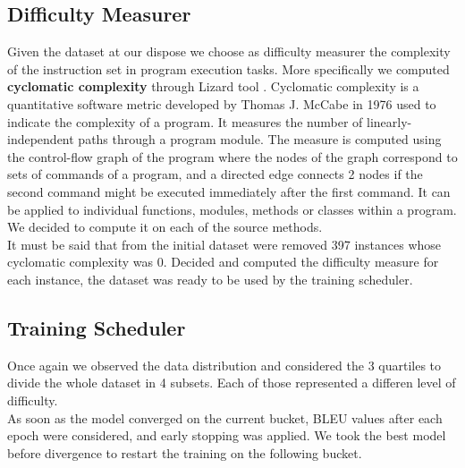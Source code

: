 
\subsection{Difficulty Measurer}
Given the dataset at our dispose we choose as difficulty measurer the 
complexity of the instruction set in program execution tasks. More specifically we 
computed \textbf{cyclomatic complexity} through Lizard tool \cite{lizard}. Cyclomatic complexity
is a quantitative software metric developed by Thomas J. McCabe in 1976 used to indicate
the complexity of a program.  
It measures the number of linearly-independent paths through a program module. 
The measure is computed using the control-flow graph of the program where
the nodes of the graph correspond to sets of commands of a program, and
a directed edge connects 2 nodes if the second command might be executed
immediately after the first command. It can be applied to individual functions,
modules, methods or classes within a program. We decided to compute it on each of
the source methods.\\
It must be said that from the initial dataset were removed 397 instances whose
cyclomatic complexity was 0. Decided and computed the difficulty measure
for each instance, the dataset was ready to be used by the training scheduler.


\subsection{Training Scheduler}
Once again we observed the data distribution and considered the 3 quartiles
to divide the whole dataset in 4 subsets. Each of those represented a differen level of difficulty.\\
As soon as the model converged on the current bucket, BLEU values after each epoch were considered,
and early stopping was applied. We took the best model before divergence to restart the training 
on the following bucket. 








